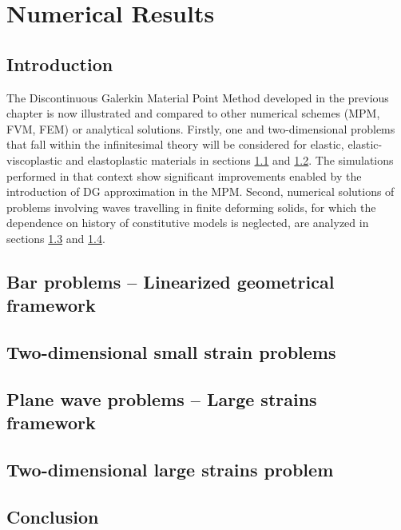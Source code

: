\chapter{Numerical Results}
\section*{Introduction}
The Discontinuous Galerkin Material Point Method developed in the previous chapter is now illustrated and compared to other numerical schemes (MPM, FVM, FEM) or analytical solutions. 
Firstly, one and two-dimensional problems that fall within the infinitesimal theory will be considered for elastic, elastic-viscoplastic and elastoplastic materials in sections \ref{sec:1dhpp_simulations} and \ref{sec:2dhpp_simulations}. The simulations performed in that context show significant improvements enabled by the introduction of DG approximation in the MPM. Second, numerical solutions of problems involving waves travelling in finite deforming solids, for which the dependence on history of constitutive models is neglected, are analyzed in sections \ref{sec:1dhe_simulations} and \ref{sec:2dhe_simulations}.


\section{Bar problems -- Linearized geometrical framework}
\label{sec:1dhpp_simulations}


\section{Two-dimensional small strain problems}
\label{sec:2dhpp_simulations}



\section{Plane wave problems -- Large strains framework}
\label{sec:1dhe_simulations}


\section{Two-dimensional large strains problem}
\label{sec:2dhe_simulations}


\section{Conclusion}
